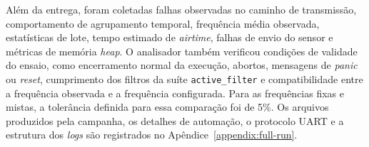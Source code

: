 Além da entrega, foram coletadas falhas observadas no caminho de transmissão,
comportamento de agrupamento temporal, frequência média observada, estatísticas
de lote, tempo estimado de \emph{airtime}, falhas de envio do sensor e métricas
de memória \emph{heap}. O analisador também verificou condições de validade do
ensaio, como encerramento normal da execução, abortos, mensagens de \emph{panic}
ou \emph{reset}, cumprimento dos filtros da suíte \texttt{active\_filter} e
compatibilidade entre a frequência observada e a frequência configurada. Para as
frequências fixas e mistas, a tolerância definida para essa comparação foi de
5\%. Os arquivos produzidos pela campanha, os detalhes de automação, o protocolo
UART e a estrutura dos \emph{logs} são registrados no
Apêndice~\ref{appendix:full-run}.
